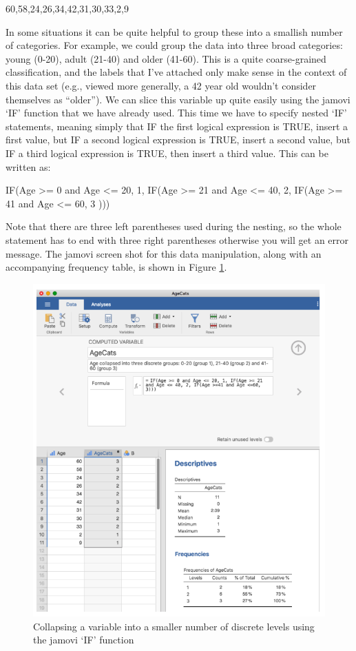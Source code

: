 \documentclass[
]{book}
\begin{document}
60,58,24,26,34,42,31,30,33,2,9

In some situations it can be quite helpful to group these into a smallish number of categories. For example, we could group the data into three broad categories: young (0-20), adult (21-40) and older (41-60). This is a quite coarse-grained classification, and the labels that I've attached only make sense in the context of this data set (e.g., viewed more generally, a 42 year old wouldn't consider themselves as ``older''). We can slice this variable up quite easily using the jamovi `IF' function that we have already used. This time we have to specify nested `IF' statements, meaning simply that IF the first logical expression is TRUE, insert a first value, but IF a second logical expression is TRUE, insert a second value, but IF a third logical expression is TRUE, then insert a third value. This can be written as:

IF(Age \textgreater= 0 and Age \textless= 20, 1, IF(Age \textgreater= 21 and Age \textless= 40, 2, IF(Age \textgreater= 41 and Age \textless= 60, 3 )))

Note that there are three left parentheses used during the nesting, so the whole statement has to end with three right parentheses otherwise you will get an error message. The jamovi screen shot for this data manipulation, along with an accompanying frequency table, is shown in Figure \ref{fig:fig6-6}.

\begin{figure}
\includegraphics[width=0.9\linewidth]{images/Figure40} \caption{Collapsing a variable into a smaller number of discrete levels using the jamovi ‘IF’ function}\label{fig:fig6-6}
\end{figure}
\end{document}
